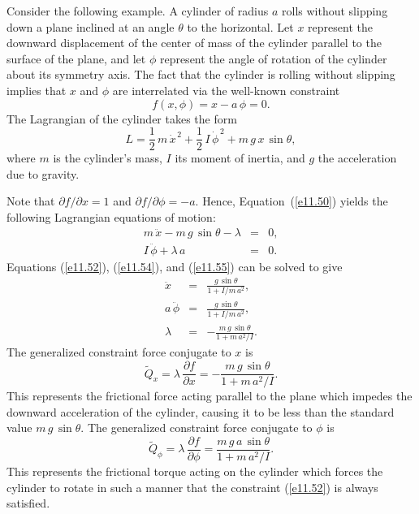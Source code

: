 Consider the following example. A cylinder of radius $a$ rolls without slipping down a plane
inclined at an angle $\theta$ to the horizontal. Let $x$ represent the downward displacement of the center of mass of the cylinder parallel to the surface of the plane, and let $\phi$ represent the angle of rotation of the cylinder about
its symmetry axis. The fact that the cylinder is rolling without slipping
implies that $x$ and $\phi$ are interrelated via the well-known constraint
\begin{equation}\label{e11.52}
f(x,\phi) = x - a\,\phi = 0.
\end{equation}
The Lagrangian of the cylinder takes the form
\begin{equation}
L = \frac{1}{2}\,m\,\dot{x}^{\,2} + \frac{1}{2}\,I\,\dot{\phi}^{\,2} + m\,g\,x\,\sin\theta,
\end{equation}
where $m$ is the cylinder's mass, $I$  its moment of inertia, and $g$
the acceleration due to gravity. 

Note that $\partial f/\partial x = 1$ and $\partial f/\partial\phi = -a$. Hence,
Equation~(\ref{e11.50}) yields the following Lagrangian equations of motion:
\begin{eqnarray}
m\,\ddot{x} - m\,g\,\sin\theta - \lambda &=& 0,\label{e11.54}\\[0.5ex]
I\,\ddot{\phi} + \lambda\,a &=&0.\label{e11.55}
\end{eqnarray}
Equations (\ref{e11.52}), (\ref{e11.54}), and (\ref{e11.55}) can be solved to
give
\begin{eqnarray}
\ddot{x} &=& \frac{g\,\sin\theta}{1+ I/m\,a^2},\\[0.5ex]
a\,\ddot{\phi}&=& \frac{g\,\sin\theta}{1+ I/m\,a^2},\\[0.5ex]
\lambda &=& -\frac{m\,g\,\sin\theta}{1+ m\,a^2/I}. 
\end{eqnarray}
The generalized constraint force conjugate to $x$ is
\begin{equation}
\tilde{Q}_x =  \lambda\,\frac{\partial f}{\partial x} = - \frac{m\,g\,\sin\theta}{1+ m\,a^2/I}.
\end{equation}
This represents the frictional force acting parallel to the plane which
impedes the downward acceleration of the cylinder, causing it to be less than the standard value $m\,g\,\sin\theta$. The
generalized constraint force conjugate to $\phi$ is
\begin{equation}
\tilde{Q}_\phi =  \lambda\,\frac{\partial f}{\partial\phi} = 
\frac{m\,g\,a\,\sin\theta}{1+ m\,a^2/I}.
\end{equation}
This represents the frictional torque acting on the cylinder which forces the
cylinder to rotate in such a manner that the constraint (\ref{e11.52}) is
always satisfied.

